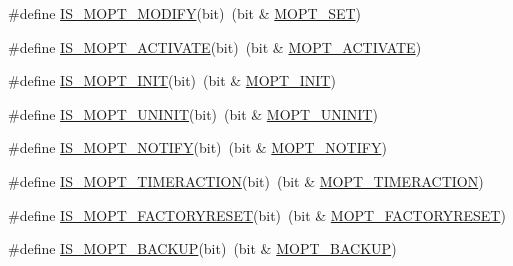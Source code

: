 \begin{DoxyCompactItemize}
\item 
\#define \hyperlink{group__LIBHELP_ga33ddb5513bb08deea13a031c64b2ba1f}{I\-S\-\_\-\-M\-O\-P\-T\-\_\-\-M\-O\-D\-I\-F\-Y}(bit)~(bit \& \hyperlink{group__LIBHELP_gga0cdba030aaa0bd18b24dbf19b06877a0ac23667be630f90a58d53d02b11d7340f}{M\-O\-P\-T\-\_\-\-S\-E\-T})
\item 
\#define \hyperlink{group__LIBHELP_gad6844975ea1c331ee03702cda99468e7}{I\-S\-\_\-\-M\-O\-P\-T\-\_\-\-A\-C\-T\-I\-V\-A\-T\-E}(bit)~(bit \& \hyperlink{group__LIBHELP_gga0cdba030aaa0bd18b24dbf19b06877a0a1310223d0caa84cc2bd6fc6711d05a87}{M\-O\-P\-T\-\_\-\-A\-C\-T\-I\-V\-A\-T\-E})
\item 
\#define \hyperlink{group__LIBHELP_ga41641fbb71e18b1edd23d5d6c3739517}{I\-S\-\_\-\-M\-O\-P\-T\-\_\-\-I\-N\-I\-T}(bit)~(bit \& \hyperlink{group__LIBHELP_gga0cdba030aaa0bd18b24dbf19b06877a0a2c480dff14f2d427e0918620ecc2b99f}{M\-O\-P\-T\-\_\-\-I\-N\-I\-T})
\item 
\#define \hyperlink{group__LIBHELP_ga119a020663142f27fc8b666d48d498d1}{I\-S\-\_\-\-M\-O\-P\-T\-\_\-\-U\-N\-I\-N\-I\-T}(bit)~(bit \& \hyperlink{group__LIBHELP_gga0cdba030aaa0bd18b24dbf19b06877a0a220bedd4cacc0c78b51f080bef0913a0}{M\-O\-P\-T\-\_\-\-U\-N\-I\-N\-I\-T})
\item 
\#define \hyperlink{group__LIBHELP_ga8f24724f4910a20f2b1189b10322e279}{I\-S\-\_\-\-M\-O\-P\-T\-\_\-\-N\-O\-T\-I\-F\-Y}(bit)~(bit \& \hyperlink{group__LIBHELP_gga0cdba030aaa0bd18b24dbf19b06877a0aa6d912b46389d3190f3e45de07d6a19d}{M\-O\-P\-T\-\_\-\-N\-O\-T\-I\-F\-Y})
\item 
\#define \hyperlink{group__LIBHELP_ga327ea9257c87d922d4cf34cdb8a38d69}{I\-S\-\_\-\-M\-O\-P\-T\-\_\-\-T\-I\-M\-E\-R\-A\-C\-T\-I\-O\-N}(bit)~(bit \& \hyperlink{group__LIBHELP_gga0cdba030aaa0bd18b24dbf19b06877a0aaea85a0ce98f63642f33097354e2b975}{M\-O\-P\-T\-\_\-\-T\-I\-M\-E\-R\-A\-C\-T\-I\-O\-N})
\item 
\#define \hyperlink{group__LIBHELP_ga6e92593fbe6e2134b813ad8e6abd7096}{I\-S\-\_\-\-M\-O\-P\-T\-\_\-\-F\-A\-C\-T\-O\-R\-Y\-R\-E\-S\-E\-T}(bit)~(bit \& \hyperlink{group__LIBHELP_gga0cdba030aaa0bd18b24dbf19b06877a0acab2d045536f6f87639d9ddc92a15bfb}{M\-O\-P\-T\-\_\-\-F\-A\-C\-T\-O\-R\-Y\-R\-E\-S\-E\-T})
\item 
\#define \hyperlink{group__LIBHELP_ga9de8ee4c98ad993b22628874da930ab7}{I\-S\-\_\-\-M\-O\-P\-T\-\_\-\-B\-A\-C\-K\-U\-P}(bit)~(bit \& \hyperlink{group__LIBHELP_gga0cdba030aaa0bd18b24dbf19b06877a0a79fba642447da8df763572c75b2d5e30}{M\-O\-P\-T\-\_\-\-B\-A\-C\-K\-U\-P})
\item 

\end{DoxyCompactItemize}
